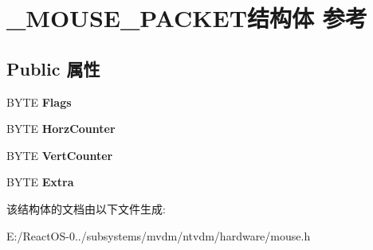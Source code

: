 \hypertarget{struct___m_o_u_s_e___p_a_c_k_e_t}{}\section{\+\_\+\+M\+O\+U\+S\+E\+\_\+\+P\+A\+C\+K\+E\+T结构体 参考}
\label{struct___m_o_u_s_e___p_a_c_k_e_t}
\subsection*{Public 属性}
\begin{DoxyCompactItemize}
\item 
\mbox{\label{struct___m_o_u_s_e___p_a_c_k_e_t_abd5bd31758e64998a7c65b7b82fe85d4}} 
B\+Y\+TE {\bfseries Flags}
\item 
\mbox{\label{struct___m_o_u_s_e___p_a_c_k_e_t_ac92cd52d03e4dacbd449a94e1c2e89e7}} 
B\+Y\+TE {\bfseries Horz\+Counter}
\item 
\mbox{\label{struct___m_o_u_s_e___p_a_c_k_e_t_a586f30a18d44d2861008207742d5e3eb}} 
B\+Y\+TE {\bfseries Vert\+Counter}
\item 
\mbox{\label{struct___m_o_u_s_e___p_a_c_k_e_t_afe0ba3458460b44170e7248244a8ad9d}} 
B\+Y\+TE {\bfseries Extra}
\end{DoxyCompactItemize}


该结构体的文档由以下文件生成\+:\begin{DoxyCompactItemize}
\item 
E\+:/\+React\+O\+S-\/0../subsystems/mvdm/ntvdm/hardware/mouse.\+h\end{DoxyCompactItemize}

